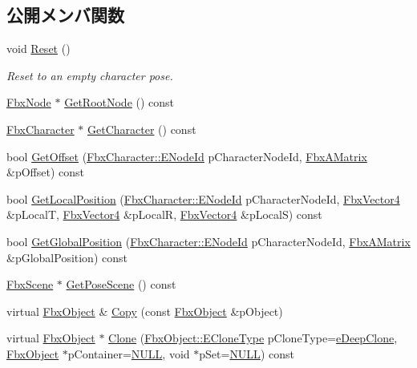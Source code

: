\subsection*{公開メンバ関数}
\begin{DoxyCompactItemize}
\item 
void \hyperlink{class_fbx_character_pose_ab0aa178aa39799fae44ef3837dfcc9bf}{Reset} ()
\begin{DoxyCompactList}\small\item\em Reset to an empty character pose. \end{DoxyCompactList}\item 
\hyperlink{class_fbx_node}{Fbx\+Node} $\ast$ \hyperlink{class_fbx_character_pose_a7dd8f39dcef2c74844a3d367a67a681b}{Get\+Root\+Node} () const
\item 
\hyperlink{class_fbx_character}{Fbx\+Character} $\ast$ \hyperlink{class_fbx_character_pose_ac0429f7f15902a3eeb0c50e890529cde}{Get\+Character} () const
\item 
bool \hyperlink{class_fbx_character_pose_a0abc45efdccf78de0b736232bb85e106}{Get\+Offset} (\hyperlink{class_fbx_character_ad75bf42026e435ac0ff4d7ece2317be4}{Fbx\+Character\+::\+E\+Node\+Id} p\+Character\+Node\+Id, \hyperlink{class_fbx_a_matrix}{Fbx\+A\+Matrix} \&p\+Offset) const
\item 
bool \hyperlink{class_fbx_character_pose_ab258febbc8198b6687eaef43654909c5}{Get\+Local\+Position} (\hyperlink{class_fbx_character_ad75bf42026e435ac0ff4d7ece2317be4}{Fbx\+Character\+::\+E\+Node\+Id} p\+Character\+Node\+Id, \hyperlink{class_fbx_vector4}{Fbx\+Vector4} \&p\+LocalT, \hyperlink{class_fbx_vector4}{Fbx\+Vector4} \&p\+LocalR, \hyperlink{class_fbx_vector4}{Fbx\+Vector4} \&p\+LocalS) const
\item 
bool \hyperlink{class_fbx_character_pose_abe05a6239a8a3e436a3e4d28ccde5499}{Get\+Global\+Position} (\hyperlink{class_fbx_character_ad75bf42026e435ac0ff4d7ece2317be4}{Fbx\+Character\+::\+E\+Node\+Id} p\+Character\+Node\+Id, \hyperlink{class_fbx_a_matrix}{Fbx\+A\+Matrix} \&p\+Global\+Position) const
\item 
\hyperlink{class_fbx_scene}{Fbx\+Scene} $\ast$ \hyperlink{class_fbx_character_pose_a7176bff4eda08a17158ec2f0850eb39a}{Get\+Pose\+Scene} () const
\item 
virtual \hyperlink{class_fbx_object}{Fbx\+Object} \& \hyperlink{class_fbx_character_pose_a7d4ac33deebb7bbfef01f3b6ba3b3cff}{Copy} (const \hyperlink{class_fbx_object}{Fbx\+Object} \&p\+Object)
\item 
virtual \hyperlink{class_fbx_object}{Fbx\+Object} $\ast$ \hyperlink{class_fbx_character_pose_af191f8d48c8f11e795adcb92adae35c5}{Clone} (\hyperlink{class_fbx_object_a9f5626b2d2135684d6ea1e6e4ad2acbb}{Fbx\+Object\+::\+E\+Clone\+Type} p\+Clone\+Type=\hyperlink{class_fbx_object_a9f5626b2d2135684d6ea1e6e4ad2acbbaacdf137ca059c572798287e98c4236d0}{e\+Deep\+Clone}, \hyperlink{class_fbx_object}{Fbx\+Object} $\ast$p\+Container=\hyperlink{fbxarch_8h_a070d2ce7b6bb7e5c05602aa8c308d0c4}{N\+U\+LL}, void $\ast$p\+Set=\hyperlink{fbxarch_8h_a070d2ce7b6bb7e5c05602aa8c308d0c4}{N\+U\+LL}) const

\end{DoxyCompactItemize}
